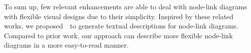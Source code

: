To sum up, few relevant enhancements are able to deal with node-link diagrams with flexible visual designs due to their simplicity. Inspired by these related works, we proposed~\ApproachName~to generate textual descriptions for node-link diagrams. Compared to prior work, our approach can describe more flexible node-link diagrams in a more easy-to-read manner.